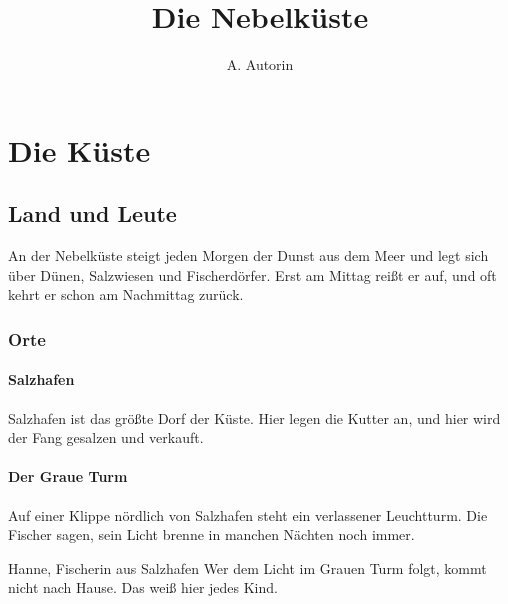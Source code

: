 \documentclass[a4paper,twoside,twocolumn,openany,nodeprecatedcode,
  srd=5.2.1,links=color,nomultitoc,bookmarksdepth=subsection]{dndbook}
\title{Die Nebelküste}
\author{A. Autorin}
\begin{document}

\frontmatter


\tableofcontents

\mainmatter

\part{Die Küste}

\chapter{Land und Leute}

An der Nebelküste steigt jeden Morgen der Dunst aus dem Meer und legt sich über Dünen, Salzwiesen und Fischerdörfer. Erst am Mittag reißt er auf, und oft kehrt er schon am Nachmittag zurück.


\section{Orte}

\subsection{Salzhafen}
Salzhafen ist das größte Dorf der Küste. Hier legen die Kutter an, und hier wird der Fang gesalzen und verkauft.

\subsection{Der Graue Turm}
Auf einer Klippe nördlich von Salzhafen steht ein verlassener Leuchtturm. Die Fischer sagen, sein Licht brenne in manchen Nächten noch immer.

\begin{DndQuotation}{Hanne, Fischerin aus Salzhafen}
  Wer dem Licht im Grauen Turm folgt, kommt nicht nach Hause. Das weiß hier jedes Kind.
\end{DndQuotation}
\end{document}
